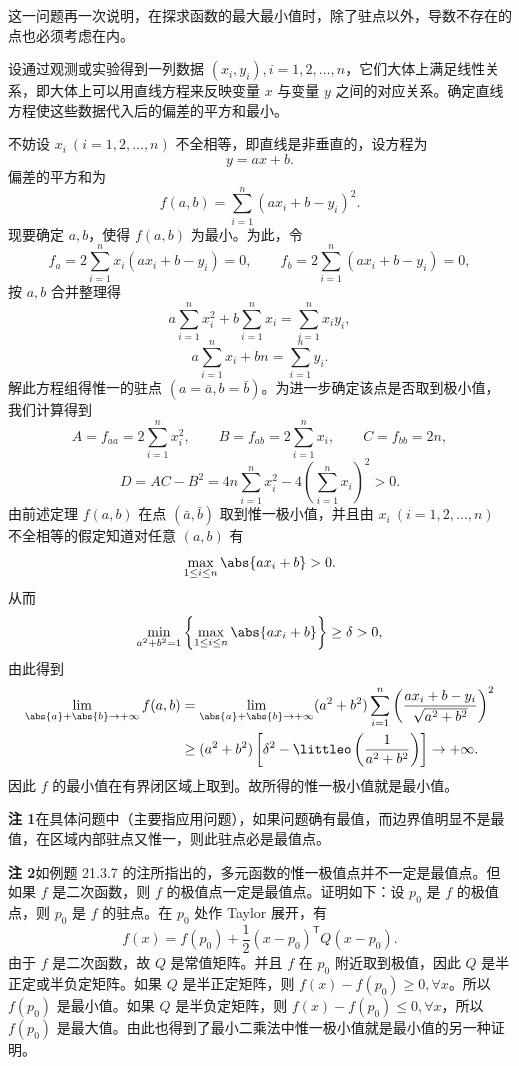 \begin{xremark}
这一问题再一次说明，在探求函数的最大最小值时，除了驻点以外，导数不存在的点也必须考虑在内。
\end{xremark}

\begin{xexample}[21.3.10（最小二乘法）]
设通过观测或实验得到一列数据 $(x_i,y_i),i=1,2,\ldots,n$，它们大体上满足线性关系，即大体上可以用直线方程来反映变量 $x$ 与变量 $y$ 之间的对应关系。确定直线方程使这些数据代入后的偏差的平方和最小。
\end{xexample}
\begin{xsolution}
不妨设 $x_i\ (i=1,2,\ldots,n)$ 不全相等，即直线是非垂直的，设方程为
\[
  y=ax+b.
\]
偏差的平方和为
\[
  f(a,b)=\sum_{i=1}^n(ax_i+b-y_i)^2.
\]
现要确定 $a,b$，使得 $f(a,b)$ 为最小。为此，令
\[
  f_a=2\sum_{i=1}^n x_i(ax_i+b-y_i)=0,
  \qquad
  f_b=2\sum_{i=1}^n(ax_i+b-y_i)=0,
\]
按 $a,b$ 合并整理得
\[
  a\sum_{i=1}^n x_i^2+b\sum_{i=1}^n x_i=\sum_{i=1}^n x_iy_i,
\]
\[
  a\sum_{i=1}^n x_i+bn=\sum_{i=1}^n y_i.
\]
解此方程组得惟一的驻点 $(a=\bar a,b=\bar b)$。为进一步确定该点是否取到极小值，我们计算得到
\[
  A=f_{aa}=2\sum_{i=1}^n x_i^2,
  \qquad
  B=f_{ab}=2\sum_{i=1}^n x_i,
  \qquad
  C=f_{bb}=2n,
\]
\[
  D=AC-B^2=4n\sum_{i=1}^n x_i^2-4\left(\sum_{i=1}^n x_i\right)^2>0.
\]
由前述定理 $f(a,b)$ 在点 $(\bar a,\bar b)$ 取到惟一极小值，并且由 $x_i\ (i=1,2,\ldots,n)$ 不全相等的假定知道对任意 $(a,b)$ 有
\[
  \max_{1\le i\le n}\abs{ax_i+b}>0.
\]
从而
\[
  \min_{a^2+b^2=1}\left\{\max_{1\le i\le n}\abs{ax_i+b}\right\}\ge\delta>0,
\]
由此得到
\[
\begin{aligned}
  \lim_{\abs{a}+\abs{b}\to+\infty}f(a,b)
  &=\lim_{\abs{a}+\abs{b}\to+\infty}
  (a^2+b^2)\sum_{i=1}^n
  \left(\frac{ax_i+b-y_i}{\sqrt{a^2+b^2}}\right)^2\\
  &\ge(a^2+b^2)\left[\delta^2-\littleo\left(\frac1{a^2+b^2}\right)\right]\to+\infty.
\end{aligned}
\]
因此 $f$ 的最小值在有界闭区域上取到。故所得的惟一极小值就是最小值。
\end{xsolution}
\begin{xremark}
\textbf{注 1}\quad 在具体问题中（主要指应用问题），如果问题确有最值，而边界值明显不是最值，在区域内部驻点又惟一，则此驻点必是最值点。

\textbf{注 2}\quad 如例题 21.3.7 的注所指出的，多元函数的惟一极值点并不一定是最值点。但如果 $f$ 是二次函数，则 $f$ 的极值点一定是最值点。证明如下：设 $p_0$ 是 $f$ 的极值点，则 $p_0$ 是 $f$ 的驻点。在 $p_0$ 处作 Taylor 展开，有
\[
  f(x)=f(p_0)+\frac12(x-p_0)^{\mathsf T}Q(x-p_0).
\]
由于 $f$ 是二次函数，故 $Q$ 是常值矩阵。并且 $f$ 在 $p_0$ 附近取到极值，因此 $Q$ 是半正定或半负定矩阵。如果 $Q$ 是半正定矩阵，则 $f(x)-f(p_0)\ge0,\forall x$。所以 $f(p_0)$ 是最小值。如果 $Q$ 是半负定矩阵，则 $f(x)-f(p_0)\le0,\forall x$，所以 $f(p_0)$ 是最大值。由此也得到了最小二乘法中惟一极小值就是最小值的另一种证明。
\end{xremark}

